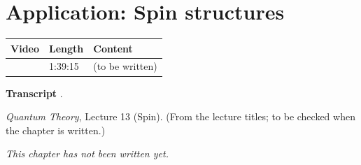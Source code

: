 \chapter{Application: Spin structures}\label{ch:l27}
\begin{paracol}{2}

\begin{sources}
\begin{tabularx}{\linewidth}{@{}l l L@{}}
\toprule
\textbf{Video} & \textbf{Length} & \textbf{Content}\\
\midrule
{} & 1:39:15 & (to be written)\\
\bottomrule
\end{tabularx}

\smallskip
\textbf{Transcript} .
\end{sources}

\begin{reading}
\emph{Quantum Theory}, Lecture 13 (Spin). (From the lecture titles; to be checked when the chapter is written.)
\end{reading}

\emph{This chapter has not been written yet.}

\flushside
\end{paracol}
